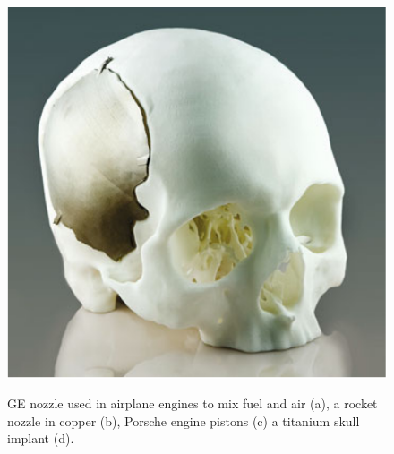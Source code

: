 \begin{figure}
{        \includegraphics[scale=0.20]{Images/skull.png}
    }
    
    \caption[Examples of AM in metals.]{GE nozzle used in airplane engines to mix fuel and air  (a), a rocket nozzle in copper (b), Porsche engine pistons (c) a titanium skull implant (d).}
    \label{fig:amexamples}
\end{figure}


